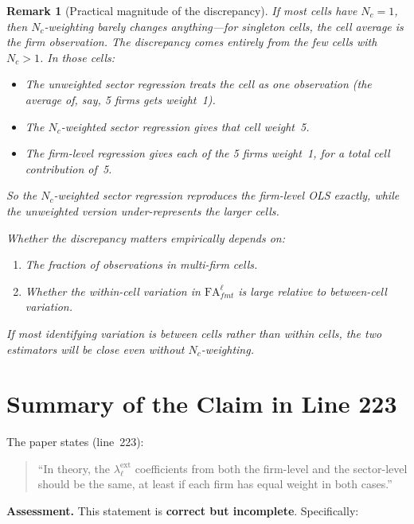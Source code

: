 \documentclass{article}
\newcommand{\FA}{\mathrm{FA}}
\theoremstyle{plain}
\newtheorem{remark}{Remark}
\begin{document}
\begin{remark}[Practical magnitude of the discrepancy]
If most cells have $N_c = 1$, then $N_c$-weighting barely changes
anything---for singleton cells, the cell average \emph{is} the firm
observation.  The discrepancy comes entirely from the few cells with $N_c > 1$.
In those cells:
\begin{itemize}
  \item The \emph{unweighted} sector regression treats the cell as one
    observation (the average of, say, 5 firms gets weight~1).
  \item The $N_c$-weighted sector regression gives that cell weight~5.
  \item The firm-level regression gives each of the 5 firms weight~1,
    for a total cell contribution of~5.
\end{itemize}
So the $N_c$-weighted sector regression reproduces the firm-level OLS exactly,
while the unweighted version under-represents the larger cells.

Whether the discrepancy matters empirically depends on:
\begin{enumerate}
  \item The fraction of observations in multi-firm cells.
  \item Whether the within-cell variation in $\FA^\ell_{fmt}$ is large
    relative to between-cell variation.
\end{enumerate}
If most identifying variation is between cells rather than within cells, the
two estimators will be close even without $N_c$-weighting.
\end{remark}

\section{Summary of the Claim in Line 223}

The paper states (line~223):
\begin{quote}
  ``In theory, the $\lambda^\mathrm{ext}_\ell$ coefficients from both the
  firm-level and the sector-level should be the same, at least if each firm
  has equal weight in both cases.''
\end{quote}

\noindent\textbf{Assessment.}  This statement is \textbf{correct but
incomplete}.  Specifically:
\end{document}
